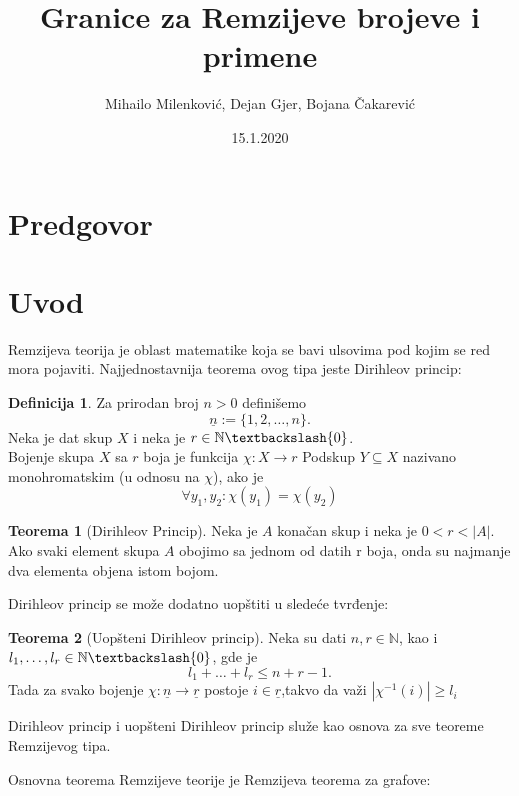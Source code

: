 \documentclass{article}
\title{Granice za Remzijeve brojeve i primene}
\date{15.1.2020}
\author{Mihailo Milenković, Dejan Gjer, Bojana Čakarević}
\theoremstyle{definition}
\newtheorem{definicija}{Definicija}[section]
\newtheorem{teorema}{Teorema}[section]
\begin{document}
	
	\maketitle
	
	\newpage
	
	\tableofcontents
	
	\newpage
	\section{Predgovor}
	
	\section{Uvod}
	
	Remzijeva teorija je oblast matematike koja se bavi ulsovima pod kojim se red mora pojaviti. Najjednostavnija teorema ovog tipa jeste Dirihleov princip:
	
	\begin{definicija}
		Za prirodan broj $n>0$ definišemo 
		\[
		\underline{n}:=\{1,2,\ldots,n\}.
		\]
		Neka je dat skup $X$ i neka je $r\in \mathbb{N}\textbackslash \{0\}$.\\	
		Bojenje skupa $X$ sa $r$ boja je funkcija $\chi:X\rightarrow r$
		Podskup $Y\subseteq X$ nazivano monohromatskim (u odnosu na $\chi$), ako je
		\[
		\forall y_1,y_2:\chi(y_1)=\chi(y_2)
		\]
	\end{definicija}
	\begin{teorema}[Dirihleov Princip]
		Neka je $A$ konačan skup i neka je $0<r<|A|$.\\ Ako svaki element skupa $A$ obojimo sa jednom od datih r boja, onda su najmanje dva elementa objena istom bojom.
	\end{teorema}
	
	
	Dirihleov princip se može dodatno uopštiti u sledeće tvrđenje:
	\begin{teorema}[Uopšteni Dirihleov princip]
		Neka su dati $n,r \in \mathbb{N}$, kao i $l_1,\ldots,l_r \in \mathbb{N}\textbackslash\{0\}$, gde je
		\[
		l_1+\ldots+l_r\leq n+r-1.
		\]
		Tada za svako bojenje $\chi:\underline{n}\rightarrow\underline{r}$ postoje $i\in \underline{r}$,takvo da važi $|\chi^{-1}(i)|\geq l_i$
	\end{teorema}
	
	Dirihleov princip i uopšteni Dirihleov princip služe kao osnova za sve teoreme Remzijevog tipa.
	
	Osnovna teorema Remzijeve teorije je Remzijeva teorema za grafove:
	
\end{document}
